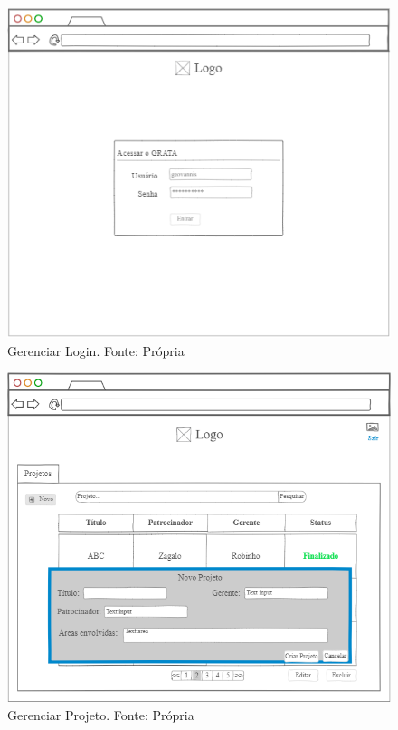 \begin{figure}[H]
    \centering
    \includegraphics[width=1.0\textwidth]{figuras/gerenciar_login.png}
    \caption{Gerenciar Login. Fonte: Própria}
    \label{img:prototipo_gerenciar_login}
\end{figure}

\begin{figure}[H]
    \centering
    \includegraphics[width=1.0\textwidth]{figuras/gerenciar_projeto.png}
    \caption{Gerenciar Projeto. Fonte: Própria}
    \label{img:prototipo_gerenciar_projeto}
\end{figure}

